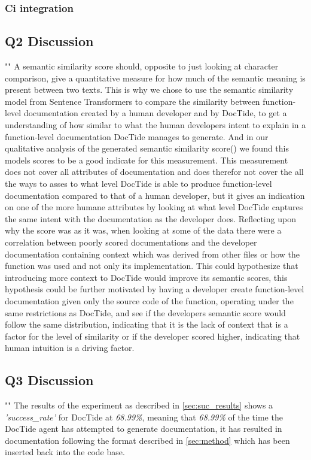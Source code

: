 \subsubsection*{Ci integration}


\subsection{Q2 Discussion}
\label{sec:DiscussionQ2}
"\textit{\subquestionII}"
A semantic similarity score should, opposite to just looking at character comparison, give a quantitative measure for how much of the semantic meaning is present between two texts. This is why we chose to use the semantic similarity model from Sentence Transformers to compare the similarity between function-level documentation created by a human developer and by DocTide, to get a understanding of how similar to what the human developers intent to explain in a function-level documentation DocTide manages to generate. And in our qualitative analysis of the generated semantic similarity score() we found this models scores to be a good indicate for this measurement. This measurement does not cover all attributes of documentation and does therefor not cover the all the ways to asses to what level DocTide is able to produce function-level documentation compared to that of a human developer, but it gives an indication on one of the more humane attributes by looking at what level DocTide captures the same intent with the documentation as the developer does.
Reflecting upon why the score was as it was, when looking at some of the data there were a correlation between poorly scored documentations and the developer documentation containing context which was derived from other files or how the function was used and not only its implementation. 
This could hypothesize that introducing more context to DocTide would improve its semantic scores, this hypothesis could be further motivated by having a developer create function-level documentation given only the source code of the function, operating under the same restrictions as DocTide, and see if the developers semantic score would follow the same distribution, indicating that it is the lack of context that is a factor for the level of similarity or if the developer scored higher, indicating that human intuition is a driving factor.
\subsection{Q3 Discussion}
\label{sec:DiscussionQ3}
"\textit{\subquestionIII}"
The results of the experiment as described in \cref{sec:suc_results} shows a \textit{'success\_rate'} for DocTide at \textit{68.99\%}, meaning that \textit{68.99\%} of the time the DocTide agent has attempted to generate documentation, it has resulted in documentation following the format described in \cref{sec:method} which has been inserted back into the code base. 
